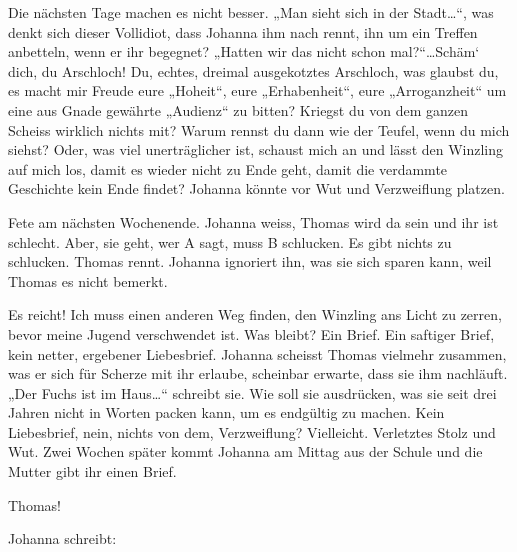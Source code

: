 \documentclass[10pt,a5paper]{book}
\begin{document}
Die nächsten Tage machen es nicht besser. „Man sieht sich in der Stadt\dots “, was denkt sich dieser Vollidiot, dass Johanna ihm nach rennt, ihn um ein Treffen anbetteln, wenn er ihr begegnet? „Hatten wir das nicht schon mal?“\dots  Schäm` dich, du Arschloch! Du, echtes, dreimal ausgekotztes Arschloch, was glaubst du, es macht mir Freude eure „Hoheit“, eure „Erhabenheit“, eure „Arroganzheit“ um eine aus Gnade gewährte „Audienz“ zu bitten? Kriegst du von dem ganzen Scheiss wirklich nichts mit? Warum rennst du dann wie der Teufel, wenn du mich siehst? Oder, was viel unerträglicher ist, schaust mich an und lässt den Winzling auf mich los, damit es wieder nicht zu Ende geht, damit die verdammte Geschichte kein Ende findet? Johanna könnte vor Wut und Verzweiflung platzen.

Fete am nächsten Wochenende. Johanna weiss, Thomas wird da sein und ihr ist schlecht. Aber, sie geht, wer A sagt, muss B schlucken. Es gibt nichts zu schlucken. Thomas rennt. Johanna ignoriert ihn, was sie sich sparen kann, weil Thomas es nicht bemerkt.

Es reicht! Ich muss einen anderen Weg finden, den Winzling ans Licht zu zerren, bevor meine Jugend verschwendet ist. Was bleibt? Ein Brief. Ein saftiger Brief, kein netter, ergebener Liebesbrief. Johanna scheisst Thomas vielmehr zusammen, was er sich für Scherze mit ihr erlaube, scheinbar erwarte, dass sie ihm nachläuft. „Der Fuchs ist im Haus\dots “ schreibt sie. Wie soll sie ausdrücken, was sie seit drei Jahren nicht in Worten packen kann, um es endgültig zu machen. Kein Liebesbrief, nein, nichts von dem, Verzweiflung? Vielleicht. Verletztes Stolz und Wut.
Zwei Wochen später kommt Johanna am Mittag aus der Schule und die Mutter gibt ihr einen Brief.

 Thomas!

Johanna schreibt:
\end{document}

